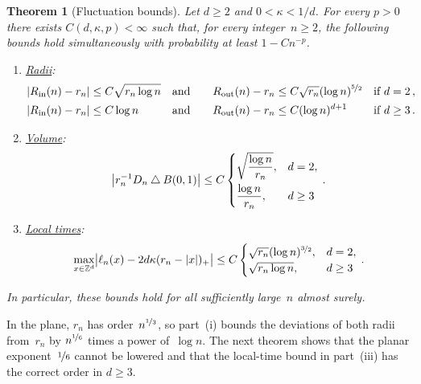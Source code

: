 \documentclass[11pt]{amsart}
\theoremstyle{plain}
\newtheorem{theorem}{Theorem}[section]
\theoremstyle{definition}
\newcommand{\Z}{\mathbb Z}
\newcommand{\drift}{\kappa}
\newcommand{\nf}{\nicefrac}
\newcommand{\Rin}{R_{\mathrm{in}}}
\newcommand{\Rout}{R_{\mathrm{out}}}
\numberwithin{equation}{section}
\begin{document}
\begin{theorem}[Fluctuation bounds]\label{thm:fluctuations}
Let $d\geq2$ and $0<\drift<1/d$. For every $p>0$ there exists $C(d,\drift,p)<\infty$ such that, for every integer~$n\geq2$, the following bounds hold simultaneously with probability at least $1-Cn^{-p}$.
\begin{enumerate}[label=\textup{(\roman*)}]
\item \underline{\emph{Radii}}:
\begin{equation*}
\begin{aligned}
|\Rin(n)-r_n|&\leq C\sqrt{r_n\log n}&&\text{and}\quad&\Rout(n)-r_n&\leq C\sqrt{r_n}(\log n)^{\nf52}&&\text{if } d=2\, ,\\
|\Rin(n)-r_n|&\leq C\log n&&\text{and}\quad&\Rout(n)-r_n&\leq C(\log n)^{d+1}&&\text{if } d\geq3\, .
\end{aligned}
\end{equation*}
\item \underline{\emph{Volume}}:
\begin{equation*}
\bigl|r_n^{-1}D_n\mathbin{\triangle}B(0,1)\bigr|
\leq C\begin{dcases}\sqrt{\frac{\log n}{r_n}},&d=2,\\\frac{\log n}{r_n},&d\geq3\end{dcases}\, .
\end{equation*}
\item \underline{\emph{Local times}}:
\begin{equation*}
\max_{x\in\Z^d}\bigl|\ell_n(x)-2d\drift(r_n-|x|)_+\bigr|
\leq C\begin{cases}\sqrt{r_n}(\log n)^{\nf32},&d=2,\\\sqrt{r_n\log n},&d\geq3\end{cases}\, .
\end{equation*}
\end{enumerate}
In particular, these bounds hold for all sufficiently large~$n$ almost surely. 
\end{theorem}

In the plane, $r_n$ has order~$n^{\nf13}$, so part~(i) bounds the deviations of both radii from~$r_n$ by $n^{\nf16}$ times a power of~$\log n$. The next theorem shows that the planar exponent~$\nf16$ cannot be lowered and that the local-time bound in part~(iii) has the correct order in $d\geq3$.
\end{document}
